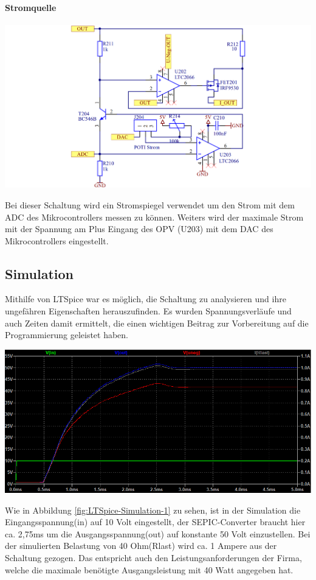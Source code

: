 \documentclass[paper=a4, 12pt]{scrreprt}
\begin{document}
			\paragraph{Stromquelle}\hfill \break
			\begin{adjustbox}{center,caption={Schaltung für die Einstellbare Stromquelle},label={fig:stromquelle},nofloat=figure,vspace=\bigskipamount}
				\includegraphics[width=\textwidth]{img/Stromquelle_SEPIC.PNG}
			\end{adjustbox}
			Bei dieser Schaltung wird ein Stromspiegel verwendet um den Strom mit dem ADC des Mikrocontrollers messen zu können. Weiters wird der maximale Strom mit der Spannung am Plus Eingang des OPV (U203) mit dem DAC des Mikrocontrollers eingestellt.\newpage
			
		\subsection{Simulation}\hfill \break
			Mithilfe von LTSpice war es möglich, die Schaltung zu analysieren und ihre ungefähren Eigenschaften herauszufinden. Es wurden Spannungsverläufe und auch Zeiten damit ermittelt, die einen wichtigen Beitrag zur Vorbereitung auf die Programmierung geleistet haben.
			\begin{adjustbox}{center,caption={Simulation der Schaltung Mittels LTSpice},label={fig:LTSpice-Simulation-1},nofloat=figure,vspace=\bigskipamount}
				\includegraphics[width=\textwidth]{img/LTSpice_Simulation_1.PNG}
			\end{adjustbox}
			Wie in Abbildung \ref{fig:LTSpice-Simulation-1} zu sehen, ist in der Simulation die Eingangsspannung(in) auf 10 Volt eingestellt, der SEPIC-Converter braucht hier ca. 2,75ms um die Ausgangsspannung(out) auf konstante 50 Volt einzustellen. Bei der simulierten Belastung von 40 Ohm(Rlast) wird ca. 1 Ampere aus der Schaltung gezogen. Das entspricht auch den Leistungsanforderungen der Firma, welche die maximale benötigte Ausgangsleistung mit 40 Watt angegeben hat.
			
\end{document}
